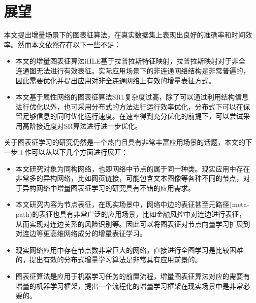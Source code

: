 \section{展望}
本文提出增量场景下的图表征算法，在真实数据集上表现出良好的准确率和时间效率。然而本文依然存在以下一些不足：
\begin{itemize}
	\item 本文的增量图表征算法iHLE基于拉普拉斯特征映射，拉普拉斯映射对于非全连通图无法进行有效表征。实际应用场景下的非连通网络结构是非常普遍的，因此需要优化并提出应用对非全连通网络上有效的增量表征方式。
	\item 本文基于属性网络的图表征算法SR1复杂度过高，除了可以通过利用结构信息进行优化以外，也可采用分布式的方法进行运行效率优化，分布式下可以在保留足够信息的同时优化运行速度。在速率得到充分优化的前提下，可以尝试采用高阶接近度对SR算法进行进一步优化。 
\end{itemize}
关于图表征学习的研究仍然是一个热门且具有非常丰富应用场景的话题，本文的下一步工作可以从以下几个方面进行展开：
\begin{itemize}
	\item 本文研究对象为同构网络，也即网络中节点的属于同一种类。现实应用中存在非常多的异构网络，比如网页链接，可能包含文本图像等各种不同的节点，对于异构网络中增量图表征学习的研究具有不错的应用需求。
	\item 本文研究内容为节点表征，在现实场景中，网络中边的表征甚至元路径(meta-path)的表征也具有非常广泛的应用场景，比如金融风控中对连边进行表征，从而实现对连边关系的风险识别等。因此可以将图表征对节点向量学习扩展到对连边等更高维网络成分的增量表征学习。
	\item 现实网络应用中存在节点数非常巨大的网络，直接进行全图学习是比较困难的，提出有效的分布式增量学习算法是非常具有应用前景的。
	\item 图表征算法是应用于机器学习任务的前置流程，增量图表征算法对应的需要有增量的机器学习框架，提出一个流程化的增量学习框架在现实场景中是非常必要的。
\end{itemize}